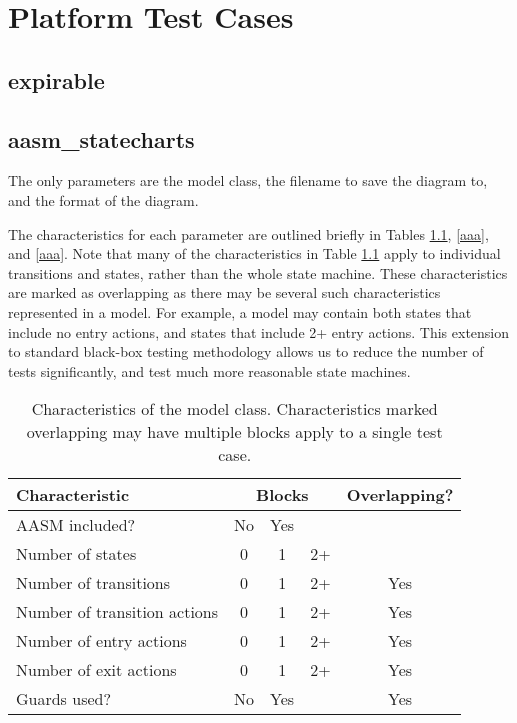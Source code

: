 \documentclass[document.tex]{subfiles}
\begin{document}
\chapter{Platform Test Cases}
\label {ch:platform-test-cases}


\section {expirable}


\section {aasm\_statecharts}
\label {sec:platform-test-cases-aasm_statecharts}

The only parameters are the model class, the filename to save the diagram to, and the format of the diagram.

The characteristics for each parameter are outlined briefly in Tables \ref{tbl:platform-test-cases-aasm_statecharts-aasm-xtics}, \ref{aaa}, and \ref{aaa}. Note that many of the characteristics in Table \ref{tbl:platform-test-cases-aasm_statecharts-aasm-xtics} apply to individual transitions and states, rather than the whole state machine. These characteristics are marked as overlapping as there may be several such characteristics represented in a model. For example, a model may contain both states that include no entry actions, and states that include 2+ entry actions. This extension to standard black-box testing methodology allows us to reduce the number of tests significantly, and test much more reasonable state machines.

\begin{table}[!htbp]
  \centering
  \caption{Characteristics of the model class. Characteristics marked overlapping may have multiple blocks apply to a single test case.}
  \label{tbl:platform-test-cases-aasm_statecharts-aasm-xtics}

  \vspace{3mm}
  \begin{tabular}{l *{3}{c} c}
    \hline
    Characteristic & \multicolumn{3}{c}{Blocks} & Overlapping? \\
    \hline
    AASM included? & No & Yes & & \\
    Number of states & 0 & 1 & 2+ & \\
    Number of transitions & 0 & 1 & 2+ & Yes \\
    Number of transition actions & 0 & 1 & 2+ & Yes \\
    Number of entry actions & 0 & 1 & 2+ & Yes \\
    Number of exit actions & 0 & 1 & 2+ & Yes \\
    Guards used? & No & Yes & & Yes \\
    \hline
  \end{tabular}
\end{table}
\end{document}
